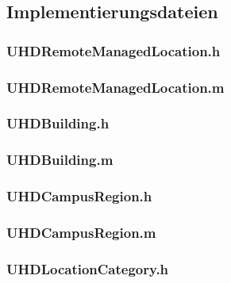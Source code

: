 \documentclass{report}
\begin{document}
\subsection{Implementierungsdateien}

\subsubsection{UHDRemoteManagedLocation.h}



\vspace{0,5cm}

\subsubsection{UHDRemoteManagedLocation.m}



\vspace{0,5cm}

\subsubsection{UHDBuilding.h}



\vspace{0,5cm}

\subsubsection{UHDBuilding.m}


\newpage
\subsubsection{UHDCampusRegion.h}



\vspace{0,5cm}

\subsubsection{UHDCampusRegion.m}


\vspace{0,5cm}

\subsubsection{UHDLocationCategory.h}

\end{document}
